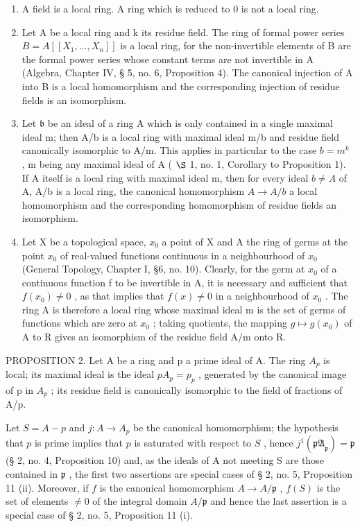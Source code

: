 \begin{enumerate}
\def\labelenumi{(\arabic{enumi})}
\item
  A field is a local ring. A ring which is reduced to 0 is not a local ring.
\item
  Let A be a local ring and k its residue field. The ring of formal power series \(B = A[[X_{1}, \ldots, X_{n}]]\) is a local ring, for the non-invertible elements of B are the formal power series whose constant terms are not invertible in A (Algebra, Chapter IV, § 5, no. 6, Proposition 4). The canonical injection of A into B is a local homomorphism and the corresponding injection of residue fields is an isomorphism.
\item
  Let \(\mathfrak{b}\) be an ideal of a ring A which is only contained in a single maximal ideal m; then A/b is a local ring with maximal ideal m/b and residue field canonically isomorphic to A/m. This applies in particular to the case \(b = m^{k}\) , m being any maximal ideal of A ( \(\S\) 1, no. 1, Corollary to Proposition 1). If A itself is a local ring with maximal ideal m, then for every ideal \(b \neq A\) of A, A/b is a local ring, the canonical homomorphism \(A \to A/b\) a local homomorphism and the corresponding homomorphism of residue fields an isomorphism.
\item
  Let X be a topological space, \(x_{0}\) a point of X and A the ring of germs at the point \(x_{0}\) of real-valued functions continuous in a neighbourhood of \(x_{0}\) (General Topology, Chapter I, §6, no. 10). Clearly, for the germ at \(x_{0}\) of a continuous function f to be invertible in A, it is necessary and sufficient that \(f(x_{0}) \neq 0\) , as that implies that \(f(x) \neq 0\) in a neighbourhood of \(x_{0}\) . The ring A is therefore a local ring whose maximal ideal m is the set of germs of functions which are zero at \(x_{0}\) ; taking quotients, the mapping \(g \mapsto g(x_{0})\) of A to R gives an isomorphism of the residue field A/m onto R.
\end{enumerate}

PROPOSITION 2. Let A be a ring and p a prime ideal of A. The ring \(A_{p}\) is local; its maximal ideal is the ideal \(pA_{p} = p_{p}\) , generated by the canonical image of p in \(A_{p}\) ; its residue field is canonically isomorphic to the field of fractions of A/p.

Let \(S = A - p\) and \(j: A \to A_p\) be the canonical homomorphism; the hypothesis that \(p\) is prime implies that \(p\) is saturated with respect to \(S\) , hence \(j^{1}(\mathfrak{pA}_{\mathfrak{p}}) = \mathfrak{p}\) (§ 2, no. 4, Proposition 10) and, as the ideals of A not meeting S are those contained in \(\mathfrak{p}\) , the first two assertions are special cases of § 2, no. 5, Proposition 11 (ii). Moreover, if \(f\) is the canonical homomorphism \(A \to A/\mathfrak{p}\) , \(f(S)\) is the set of elements \(\neq 0\) of the integral domain \(A/\mathfrak{p}\) and hence the last assertion is a special case of § 2, no. 5, Proposition 11 (i).

